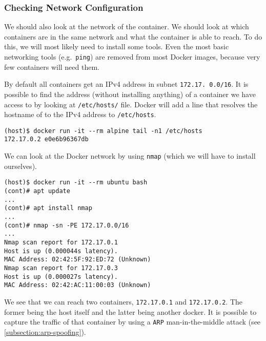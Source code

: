 \subsubsection{Checking Network Configuration}
We should also look at the network of the container. We should look at which containers are in the same network and what the container is able to reach. To do this, we will most likely need to install some tools. Even the most basic networking tools (e.g.\ \lstinline{ping}) are removed from most Docker images, because very few containers will need them.

By default all containers get an IPv4 address in subnet \lstinline{172.17. 0.0/16}. It is possible to find the address (without installing anything) of a container we have access to by looking at \lstinline{/etc/hosts/} file. Docker will add a line that resolves the hostname of to the IPv4 address to \lstinline{/etc/hosts}.

\begin{lstlisting}[caption={Last line of \lstinline{/etc/hosts} in Docker.},captionpos=b]
(host)$ docker run -it --rm alpine tail -n1 /etc/hosts
172.17.0.2 e0e6b96367db
\end{lstlisting}


We can look at the Docker network by using \lstinline{nmap} (which we will have to install ourselves).
\begin{lstlisting}[caption={\lstinline{nmap} scan inside container.},captionpos=b]
(host)$ docker run -it --rm ubuntu bash
(cont)# apt update
...
(cont)# apt install nmap
...
(cont)# nmap -sn -PE 172.17.0.0/16
...
Nmap scan report for 172.17.0.1
Host is up (0.000044s latency).
MAC Address: 02:42:5F:92:ED:72 (Unknown)
Nmap scan report for 172.17.0.3
Host is up (0.000027s latency).
MAC Address: 02:42:AC:11:00:03 (Unknown)
\end{lstlisting}

We see that we can reach two containers, \lstinline{172.17.0.1} and \lstinline{172.17.0.2}. The former being the host itself and the latter being another docker. It is possible to capture the traffic of that container by using a \lstinline{ARP} man-in-the-middle attack (see \autoref{subsection:arp-spoofing}).
